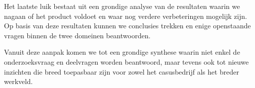 Het laatste luik bestaat uit een grondige analyse van de resultaten waarin we nagaan of het product voldoet en waar nog verdere verbeteringen mogelijk zijn. Op basis van deze resultaten kunnen we conclusies trekken en enige openstaande vragen binnen de twee domeinen beantwoorden.\newline
 
Vanuit deze aanpak komen we tot een grondige synthese waarin niet enkel de onderzoeksvraag en deelvragen worden beantwoord, maar tevens ook tot nieuwe inzichten die breed toepasbaar zijn voor zowel het casusbedrijf als het breder werkveld.



